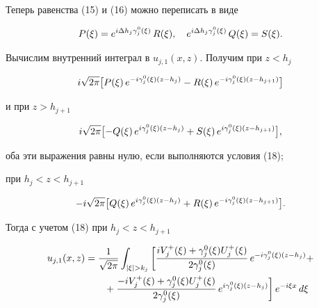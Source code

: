 \begin{pf}
Теперь равенства (15) и (16) можно переписать в виде


\begin{equation}


P(\xi) = e^{i\De h_j\gaoxi{j}}\, R(\xi),\quad


e^{i\De h_j\gaoxi{j}}\, Q(\xi) = S(\xi) .


\end{equation}





Вычислим внутренний интеграл в $u_{j,1}(x,z)$. Получим при $z<h_j$


$$


i\sqrt{2\pi} \bigl[


P(\xi)\,e^{-i\gaoxi{j}(z-h_j)} - R(\xi)\,e^{-i\gaoxi{j}(z-h_{j+1})}


\bigr]


$$


и при $z>h_{j+1}$


$$


i\sqrt{2\pi} \bigl[


- Q(\xi)\,e^{i\gaoxi{j}(z-h_j)} + S(\xi)\,e^{i\gaoxi{j}(z-h_{j+1})}


\bigr],


$$


оба эти выражения равны нулю, если выполняются условия (18);


при $h_j<z<h_{j+1}$


$$


-i\sqrt{2\pi}\bigl[


Q(\xi)\,e^{i\gaoxi{j}(z-h_j)}


+ R(\xi)\,e^{-i\gaoxi{j}(z-h_{j+1})} \bigr].


$$


Тогда с учетом (18) при $h_j<z<h_{j+1}$


\begin{align}


u_{j,1}(x,z) &= \frac{1}{\sqrt{2\pi}} \int_{|\xi|>k_j}


\bigg[


\frac{iV^+_j(\xi)+\gaoxi{j}U^+_j(\xi)}{2\gaoxi{j}}\,


e^{-i\gaoxi{j}(z-h_j)} +\notag\\


%


&\qquad+ \frac{-iV^+_j(\xi)+\gaoxi{j}U^+_j(\xi)}{2\gaoxi{j}}\,


e^{i\gaoxi{j}(z-h_j)}


\bigg]\,e^{-i\xi x}\,d\xi \\



\end{align}
\end{pf}
